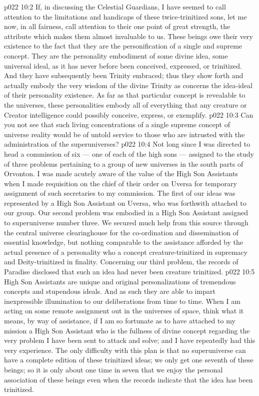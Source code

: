 \vs p022 10:2 \pc If, in discussing the Celestial Guardians, I have seemed to call attention to the limitations and handicaps of these twice\hyp{}trinitized sons, let me now, in all fairness, call attention to their one point of great strength, the attribute which makes them almost invaluable to us. These beings owe their very existence to the fact that they are the personification of a single and supreme concept. They are the personality embodiment of some divine idea, some universal ideal, as it has never before been conceived, expressed, or trinitized. And they have subsequently been Trinity embraced; thus they show forth and actually embody the very wisdom of the divine Trinity as concerns the idea\hyp{}ideal of their personality existence. As far as that particular concept is revealable to the universes, these personalities embody all of everything that any creature or Creator intelligence could possibly conceive, express, or exemplify. 
\vs p022 10:3 Can you not see that such living concentrations of a single supreme concept of universe reality would be of untold service to those who are intrusted with the administration of the superuniverses?
\vs p022 10:4 \pc Not long since I was directed to head a commission of six --- one of each of the high sons --- assigned to the study of three problems pertaining to a group of new universes in the south parts of Orvonton. I was made acutely aware of the value of the High Son Assistants when I made requisition on the chief of their order on Uversa for temporary assignment of such secretaries to my commission. The first of our ideas was represented by a High Son Assistant on Uversa, who was forthwith attached to our group. Our second problem was embodied in a High Son Assistant assigned to superuniverse number three. We secured much help from this source through the central universe clearinghouse for the co\hyp{}ordination and dissemination of essential knowledge, but nothing comparable to the assistance afforded by the actual presence of a personality who  a concept creature\hyp{}trinitized in supremacy and Deity\hyp{}trinitized in finality. Concerning our third problem, the records of Paradise disclosed that such an idea had never been creature trinitized.
\vs p022 10:5 \pc High Son Assistants are unique and original personalizations of tremendous concepts and stupendous ideals. And as such they are able to impart inexpressible illumination to our deliberations from time to time. When I am acting on some remote assignment out in the universes of space, think what it means, by way of assistance, if I am so fortunate as to have attached to my mission a High Son Assistant who is the fullness of divine concept regarding the very problem I have been sent to attack and solve; and I have repeatedly had this very experience. The only difficulty with this plan is that no superuniverse can have a complete edition of these trinitized ideas; we only get one seventh of these beings; so it is only about one time in seven that we enjoy the personal association of these beings even when the records indicate that the idea has been trinitized.
